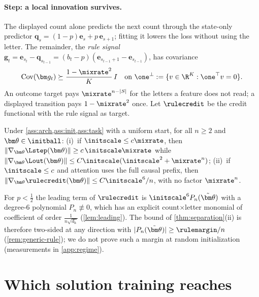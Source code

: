 \paragraph{Step: a local innovation survives.} The displayed count alone predicts the next count through the state-only predictor
$\bm q_s=(1-p)\bm e_s+p\,\bm e_{s+1}$; fitting it lowers the loss without using the letter. The remainder, the \emph{rule signal}
$\bm g_t=\bm e_{s_t}-\bm q_{s_{t-1}}=(b_t-p)(\bm e_{s_{t-1}+1}-\bm e_{s_{t-1}})$, has covariance
\begin{equation}
 \operatorname{Cov}(\bm g_t)\succeq\frac{1-\mixrate^2}{K}\,I
 \quad\text{on }\one^\perp:=\{v\in\R^K:\one^\top v=0\}.
 \label{eq:local-variation}
\end{equation}
An outcome target pays $\mixrate^{n-|S|}$ for the letters a feature does not read; a displayed transition pays $1-\mixrate^2$ once. Let
$\rulecredit$ be the credit functional with the rule signal as target.

\begin{lemma}
\label{thm:separation}
Under \cref{ass:arch,ass:init,ass:task} with a uniform start, for all $n\ge2$ and $\bm\theta\in\initball$:
(i)~if $\initscale\le c\mixrate$, then $\|\nabla_{\bm\theta}\Lstep(\bm\theta)\|\ge c\,\initscale\mixrate$ while
$\|\nabla_{\bm\theta}\Lout(\bm\theta)\|\le C\initscale(\initscale^2+\mixrate^n)$;
(ii)~if $\initscale\le c$ and attention uses the full causal prefix, then $\|\nabla_{\bm\theta}\rulecredit(\bm\theta)\|\le C\initscale^6/n$, with
no factor $\mixrate^n$.
\end{lemma}

\begin{remark}
\label{rem:leading-main}
For $p<\frac12$ the leading term of $\rulecredit$ is $\initscale^6P_n(\tilde{\bm\theta})$ with a degree-$6$ polynomial $P_n\not\equiv0$, which
has an explicit count$\times$letter monomial of coefficient of order $\frac{1}{n\sqrt{d_{\mathrm h}}}$ (\cref{lem:leading}). The bound of
\cref{thm:separation}(ii) is therefore two-sided at any direction with $|P_n(\tilde{\bm\theta})|\ge\rulemargin/n$ (\cref{rem:generic-rule}); we do not
prove such a margin at random initialization (measurements in \cref{app:regime}).
\end{remark}

\section{Which solution training reaches}
\label{sec:reach}

